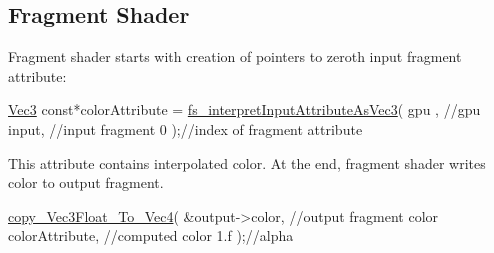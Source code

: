 \hypertarget{triangleExample.c_FragmentShader}{}\subsection{Fragment Shader}\label{triangleExample.c_FragmentShader}
Fragment shader starts with creation of pointers to zeroth input fragment attribute\+: 
\begin{DoxyCodeInclude}
  \hyperlink{structVec3}{Vec3} \textcolor{keyword}{const}*colorAttribute = \hyperlink{program_8h_a132afaeef0a64d93305bb2df3f35a524}{fs\_interpretInputAttributeAsVec3}(
      gpu  , \textcolor{comment}{//gpu}
      input, \textcolor{comment}{//input fragment}
      0    );\textcolor{comment}{//index of fragment attribute}
\end{DoxyCodeInclude}
This attribute contains interpolated color. At the end, fragment shader writes color to output fragment. 
\begin{DoxyCodeInclude}
  \hyperlink{linearAlgebra_8c_aa6574ab0f21fd2161a67abef60544177}{copy\_Vec3Float\_To\_Vec4}(
      &output->color, \textcolor{comment}{//output fragment color}
      colorAttribute, \textcolor{comment}{//computed color}
      1.f           );\textcolor{comment}{//alpha}
\end{DoxyCodeInclude}
 
\begin{DoxyCodeInclude}
\end{DoxyCodeInclude}
 